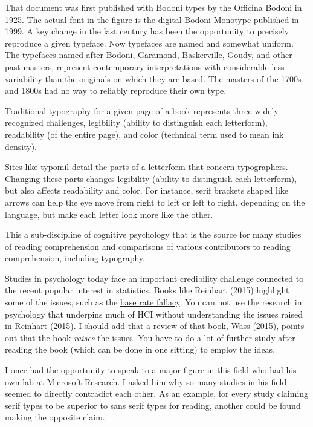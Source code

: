 That document was first published with Bodoni types by the Officina
Bodoni in 1925. The actual font in the figure is the digital Bodoni
Monotype published in 1999. A key change in the last century has been
the opportunity to precisely reproduce a given typeface. Now typefaces
are named and somewhat uniform. The typefaces named after Bodoni,
Garamond, Baskerville, Goudy, and other past masters, represent
contemporary interpretations with considerable less variability than the
originals on which they are based. The masters of the 1700s and 1800s
had no way to reliably reproduce their own type.

\hypertarget{challenges-for-type}{%
\label{challenges-for-type}}

Traditional typography for a given page of a book represents three
widely recognized challenges, legibility (ability to distinguish each
letterform), readability (of the entire page), and color (technical term
used to mean ink density).

Sites like \href{http://typomil.com/anatomy/index.html}{typomil} detail
the parts of a letterform that concern typographers. Changing these
parts changes legibility (ability to distinguish each letterform), but
also affects readability and color. For instance, serif brackets shaped
like arrows can help the eye move from right to left or left to right,
depending on the language, but make each letter look more like the
other.

\hypertarget{reading-psychology}{%
\label{reading-psychology}}

This a sub-discipline of cognitive psychology that is the source for
many studies of reading comprehension and comparisons of various
contributors to reading comprehension, including typography.

Studies in psychology today face an important credibility challenge
connected to the recent popular interest in statistics. Books like
Reinhart (2015) highlight some of the issues, such as the
\href{http://www.statisticsdonewrong.com/p-value.html}{base rate
fallacy}. You can not use the research in psychology that underpins much
of HCI without understanding the issues raised in Reinhart (2015). I
should add that a review of that book, Wass (2015), points out that the
book \emph{raises} the issues. You have to do a lot of further study
after reading the book (which can be done in one sitting) to employ the
ideas.

I once had the opportunity to speak to a major figure in this field who
had his own lab at Microsoft Research. I asked him why so many studies
in his field seemed to directly contradict each other. As an example,
for every study claiming serif types to be superior to sans serif types
for reading, another could be found making the opposite claim.

